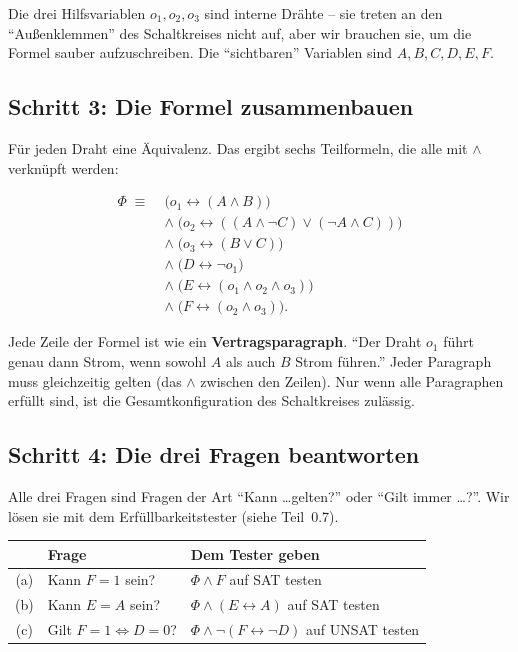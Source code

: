 \documentclass[a4paper,12pt]{article}
\begin{document}
\begin{merkbox}
Die drei Hilfsvariablen $o_1, o_2, o_3$ sind interne Dr\"ahte -- sie
treten an den "`Au{\ss}enklemmen"' des Schaltkreises nicht auf, aber
wir brauchen sie, um die Formel sauber aufzuschreiben. Die
"`sichtbaren"' Variablen sind $A, B, C, D, E, F$.
\end{merkbox}

\subsection*{Schritt 3: Die Formel zusammenbauen}

F\"ur jeden Draht eine \"Aquivalenz. Das ergibt sechs Teilformeln,
die alle mit $\wedge$ verkn\"upft werden:

\begin{align*}
\Phi \;\equiv\; & \bigl(o_1 \leftrightarrow (A \wedge B)\bigr) \\
& \wedge\; \bigl(o_2 \leftrightarrow ((A \wedge \neg C) \vee (\neg A \wedge C))\bigr) \\
& \wedge\; \bigl(o_3 \leftrightarrow (B \vee C)\bigr) \\
& \wedge\; \bigl(D \leftrightarrow \neg o_1\bigr) \\
& \wedge\; \bigl(E \leftrightarrow (o_1 \wedge o_2 \wedge o_3)\bigr) \\
& \wedge\; \bigl(F \leftrightarrow (o_2 \wedge o_3)\bigr).
\end{align*}

\begin{analogie}
Jede Zeile der Formel ist wie ein \textbf{Vertragsparagraph}. "`Der
Draht $o_1$ f\"uhrt genau dann Strom, wenn sowohl $A$ als auch $B$
Strom f\"uhren."' Jeder Paragraph muss gleichzeitig gelten (das
$\wedge$ zwischen den Zeilen). Nur wenn alle Paragraphen erf\"ullt
sind, ist die Gesamtkonfiguration des Schaltkreises zul\"assig.
\end{analogie}

\subsection*{Schritt 4: Die drei Fragen beantworten}

Alle drei Fragen sind Fragen der Art "`Kann \ldots gelten?"' oder
"`Gilt immer \ldots?"'. Wir l\"osen sie mit dem Erf\"ullbarkeitstester
(siehe Teil~0.7).

\begin{center}
\renewcommand{\arraystretch}{1.4}
\begin{tabular}{c|l|l}
\toprule
& \textbf{Frage} & \textbf{Dem Tester geben} \\
\midrule
(a) & Kann $F = 1$ sein? & $\Phi \wedge F$ auf SAT testen \\
(b) & Kann $E = A$ sein? & $\Phi \wedge (E \leftrightarrow A)$ auf SAT testen \\
(c) & Gilt $F = 1 \Leftrightarrow D = 0$? & $\Phi \wedge \neg(F \leftrightarrow \neg D)$ auf UNSAT testen \\
\bottomrule
\end{tabular}
\end{center}
\end{document}
